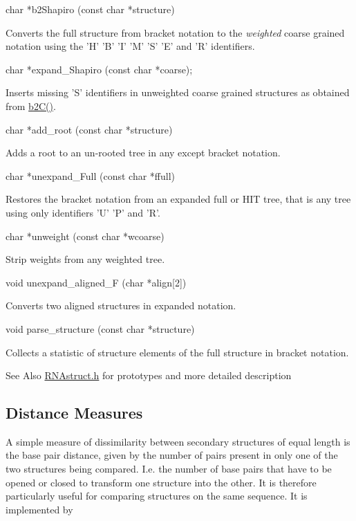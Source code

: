 \begin{DoxyVerb}char *b2Shapiro (const char *structure)
\end{DoxyVerb}
 Converts the full structure from bracket notation to the {\itshape weighted} coarse grained notation using the 'H' 'B' 'I' 'M' 'S' 'E' and 'R' identifiers.

\begin{DoxyVerb}char  *expand_Shapiro (const char *coarse);
\end{DoxyVerb}
 Inserts missing 'S' identifiers in unweighted coarse grained structures as obtained from \hyperlink{group__struct__utils_ga9c80d92391f2833549a8b6dac92233f0}{b2\-C()}.

\begin{DoxyVerb}char *add_root (const char *structure)
\end{DoxyVerb}
 Adds a root to an un-\/rooted tree in any except bracket notation.

\begin{DoxyVerb}char  *unexpand_Full (const char *ffull)
\end{DoxyVerb}
 Restores the bracket notation from an expanded full or H\-I\-T tree, that is any tree using only identifiers 'U' 'P' and 'R'.

\begin{DoxyVerb}char  *unweight (const char *wcoarse)
\end{DoxyVerb}
 Strip weights from any weighted tree.

\begin{DoxyVerb}void   unexpand_aligned_F (char *align[2])
\end{DoxyVerb}
 Converts two aligned structures in expanded notation.

\begin{DoxyVerb}void   parse_structure (const char *structure)
\end{DoxyVerb}
 Collects a statistic of structure elements of the full structure in bracket notation.

\begin{DoxySeeAlso}{See Also}
\hyperlink{RNAstruct_8h}{R\-N\-Astruct.\-h} for prototypes and more detailed description
\end{DoxySeeAlso}
\subsection*{Distance Measures}

A simple measure of dissimilarity between secondary structures of equal length is the base pair distance, given by the number of pairs present in only one of the two structures being compared. I.\-e. the number of base pairs that have to be opened or closed to transform one structure into the other. It is therefore particularly useful for comparing structures on the same sequence. It is implemented by

